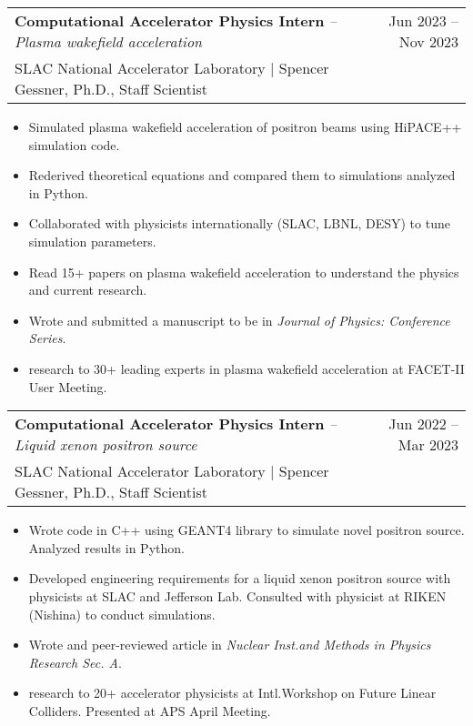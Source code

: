 \documentclass[a4paper,11pt]{article}
\makeatletter
\newcommand{\colhref}[3]{\href{#2}{\color{#1}{#3}}} %
\newenvironment{jobcustomlong}[4]
    {
    \begin{tabularx}{\linewidth}{@{}l X r@{}}
    \textbf{#1} \textit{#2} & \hfill &  #3 \\[-2.5pt]
    \textcolor{black!55!white}{\small #4} \\[2.5pt]
    \end{tabularx}
    \begin{minipage}[t]{\linewidth}
    \begin{itemize}[nosep,after=\strut, leftmargin=1.75em, itemsep=1pt,label={\small$\bullet$}]
    }
    {
    \end{itemize} \vspace{.325em}
    \end{minipage}   
    }
\makeatother
\begin{document}
\begin{jobcustomlong}{Computational Accelerator Physics Intern}{-- Plasma wakefield acceleration}{Jun 2023 -- Nov 2023}{{SLAC} National Accelerator Laboratory $\vert$ Spencer Gessner, Ph.D., Staff Scientist}
    \item Simulated plasma wakefield acceleration of positron beams using {HiPACE++} simulation code.
    \item Rederived theoretical equations and compared them to simulations analyzed in Python.
    \item Collaborated with physicists internationally ({SLAC}, {LBNL}, {DESY}) to tune simulation parameters.
    \item Read 15+ papers on plasma wakefield acceleration to understand the physics and current research.
    \item Wrote and submitted a manuscript to be \colhref{blue!65!black}{https://arxiv.org/abs/2311.07087}{published} in \textit{Journal of Physics: Conference Series}.
    \item \colhref{blue!65!black}{https://docs.google.com/presentation/d/1dLFNB72h5O4ACa0lj33pgTrrmjeLWT7p04UOhfNXdBw/edit?usp=sharing}{Presented} research to 30+ leading experts in plasma wakefield acceleration at FACET-II User Meeting.
\end{jobcustomlong}
\begin{jobcustomlong}{Computational Accelerator Physics Intern}{-- Liquid xenon positron source}{Jun 2022 -- Mar 2023}{{SLAC} National Accelerator Laboratory $\vert$ Spencer Gessner, Ph.D., Staff Scientist}
    \item Wrote code in C++ using GEANT4 library to simulate novel positron source. Analyzed results in Python.
    \item Developed engineering requirements for a liquid xenon positron source with physicists at {SLAC} and  Jefferson Lab. Consulted with physicist at {RIKEN} (Nishina) to conduct simulations.
    \item Wrote and \colhref{blue!65!black}{http://dx.doi.org/10.1016/j.nima.2023.168329}{published} peer-reviewed article in \textit{Nuclear Inst.\!\;and Methods in Physics Research Sec. A}.
    \item \colhref{blue!65!black}{https://docs.google.com/presentation/d/1vRQo0vVH0A9cEBvVVeSKDu2MXw4V9R3hdnxamKaW3T0/edit?usp=sharing}{Presented} research to 20+ accelerator physicists at Intl.\!\;Workshop on Future Linear Colliders. Presented \colhref{blue!65!black}{https://drive.google.com/file/d/1iXObaHtb2xi4kYt638eMDfPBv-0eD-CW/view?usp=sharing}{poster} at APS April Meeting.
\end{jobcustomlong}
\end{document}
